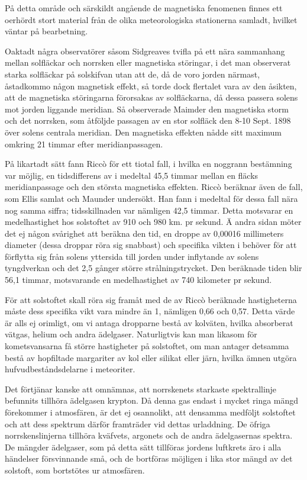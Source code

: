 \documentclass[a4paper, 12pt, oneside, swedish]{article}
\begin{document}
På detta område och särskildt angående de magnetiska fenomenen finnes ett oerhördt stort material från de olika meteorologiska stationerna samladt, hvilket väntar på bearbetning.

Oaktadt några observatörer såsom Sidgreaves tvifla på ett nära sammanhang mellan solfläckar och norrsken eller magnetiska störingar, i det man observerat starka solfläckar på solskifvan utan att de, då de voro jorden närmast, åstadkommo någon magnetisk effekt, så torde dock flertalet vara av den åsikten, att de magnetiska störingarna förorsakas av solfläckarna, då dessa passera solens mot jorden liggande meridian. Så observerade Maimder den magnetiska storm och det norrsken, som åtföljde passagen av en stor solfläck den 8-10 Sept. 1898 över solens centrala meridian. Den magnetiska effekten nådde sitt maximum omkring 21 timmar efter meridianpassagen.

På likartadt sätt fann Riccò för ett tiotal fall, i hvilka en noggrann bestämning var möjlig, en tidsdifferens av i medeltal 45,5 timmar mellan en fläcks meridianpassage och den största magnetiska effekten. Riccò beräknar även de fall, som Ellis samlat och Maunder undersökt. Han fann i medeltal för dessa fall nära nog samma siffra; tidsskillnaden var nämligen 42,5 timmar. Detta motsvarar en medelhastighet hos solstoftet av 910 och 980 km. pr sekund. Ä andra sidan möter det ej någon svårighet att beräkna den tid, en droppe av 0,00016 millimeters diameter (dessa droppar röra sig snabbast) och specifika vikten i behöver för att förflytta sig från solens yttersida till jorden under inflytande av solens tyngdverkan och det 2,5 gånger större strålningstrycket. Den beräknade tiden blir 56,1 timmar, motsvarande en medelhastighet av 740 kilometer pr sekund.

För att solstoftet skall röra sig framåt med de av Riccò beräknade hastigheterna måste dess specifika vikt vara mindre än 1, nämligen 0,66 och 0,57. Detta värde är alls ej orimligt, om vi antaga dropparne bestå av kolväten, hvilka absorberat vätgas, helium och andra ädelgaser. Naturligtvis kan man likasom för kometsvansarna få större hastigheter på solstoftet, om man antager detsamma bestå av hopfiltade margariter av kol eller silikat eller järn, hvilka ämnen utgöra hufvudbeståndsdelarne i meteoriter.

Det förtjänar kanske att omnämnas, att norrskenets starkaste spektrallinje befunnits tillhöra ädelgasen krypton. Då denna gas endast i mycket ringa mängd förekommer i atmosfären, är det ej osannolikt, att densamma medföljt solstoftet och att dess spektrum därför framträder vid dettas urladdning. De öfriga norrskenslinjerna tillhöra kväfvets, argonets och de andra ädelgasernas spektra. De mängder ädelgaser, som på detta sätt tillföras jordens luftkrets äro i alla händelser försvinnande små, och de bortföras möjligen i lika stor mängd av det solstoft, som bortstötes ur atmosfären.
\end{document}
